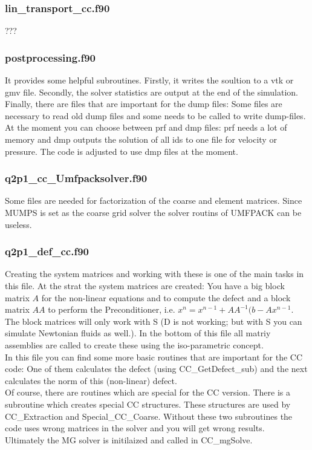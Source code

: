 \subsubsection*{lin\_transport\_cc.f90} 
???

\subsubsection*{postprocessing.f90} 
It provides some helpful subroutines. Firstly, it writes the soultion to a vtk or gmv file. Secondly, the solver statistics are output at the end of the simulation. Finally, there are files that are important for the dump files: Some files are necessary to read old dump files and some needs to be called to write dump-files. At the moment you can choose between prf and dmp files: prf needs a lot of memory and dmp outputs the solution of all ids to one file for velocity or pressure. The code is adjusted to use dmp files at the moment.

\subsubsection*{q2p1\_cc\_Umfpacksolver.f90} 
Some files are needed for factorization of the coarse and element matrices. Since MUMPS is set as the coarse grid solver the solver routins of UMFPACK can be useless.

\subsubsection*{q2p1\_def\_cc.f90} 
Creating the system matrices and working with these is one of the main tasks in this file. At the strat the system matrices are created: You have a big block matrix $A$ for the non-linear equations and to compute the defect and a block matrix $AA$ to perform the Preconditioner, i.e. $x^n = x^{n-1} + AA^{-1}(b-A x^{n-1}$. The block matrices will only work with S (D is not working; but with S you can simulate Newtonian fluids as well.). In the bottom of this file all matriy assemblies are called to create these using the iso-parametric concept.\\
In this file you can find some more basic routines that are important for the CC code: One of them calculates the defect (using CC\_GetDefect\_sub) and the next calculates the norm of this (non-linear) defect. \\
Of course, there are routines which are special for the CC version. There is a subroutine which creates special CC structures. These structures are used by CC\_Extraction and Special\_CC\_Coarse. Without these two subroutines the code uses wrong matrices in the solver and you will get wrong results.\\ 
Ultimately the MG solver is initilaized and called in CC\_mgSolve.

